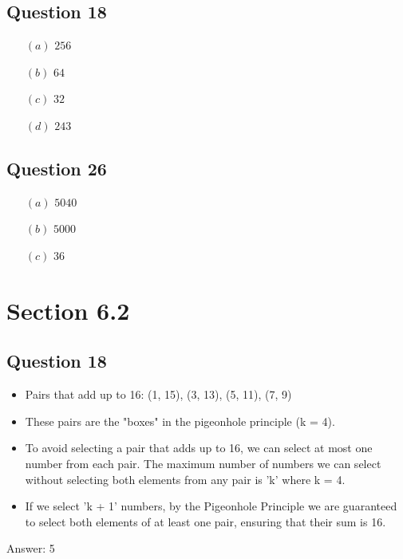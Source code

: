 \documentclass{article}
\begin{document}
\subsection*{Question 18}
\begin{itemize}
    \item[$(a)$] $256$
    
    \item[$(b)$] $64$
    
    \item[$(c)$] $32$
    
    \item[$(d)$] $243$
\end{itemize}
\subsection*{Question 26}
\begin{itemize}
    \item[$(a)$] $5040$
    
    \item[$(b)$] $5000$
    
    \item[$(c)$] $36$
\end{itemize}

\section*{Section 6.2}
\subsection*{Question 18}
    \begin{itemize}
        \item Pairs that add up to 16: (1, 15), (3, 13), (5, 11), (7, 9)
        \item These pairs are the "boxes" in the pigeonhole principle (k = 4).
        \item To avoid selecting a pair that adds up to 16, we can select at most one number from each pair. The maximum number of numbers we can select without selecting both elements from any pair is 'k' where k = 4.
        \item If we select 'k + 1' numbers, by the Pigeonhole Principle we are guaranteed to select both elements of at least one pair, ensuring that their sum is 16.
    \end{itemize}
    Answer: 5
\end{document}
